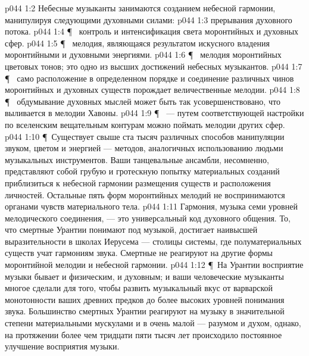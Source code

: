 \vs p044 1:2 Небесные музыканты занимаются созданием небесной гармонии, манипулируя следующими духовными силами:
\vs p044 1:3 \bibnobreakspace {} прерывания духовного потока.
\vs p044 1:4 \P\ \bibnobreakspace {} контроль и интенсификация света моронтийных и духовных сфер.
\vs p044 1:5 \P\ \bibnobreakspace {} мелодия, являющаяся результатом искусного владения моронтийными и духовными энергиями.
\vs p044 1:6 \P\ \bibnobreakspace {} мелодия моронтийных цветовых тонов; это одно из высших достижений небесных музыкантов.
\vs p044 1:7 \P\ \bibnobreakspace {} само расположение в определенном порядке и соединение различных чинов моронтийных и духовных существ порождает величественные мелодии.
\vs p044 1:8 \P\ \bibnobreakspace {} обдумывание духовных мыслей может быть так усовершенствовано, что выливается в мелодии Хавоны.
\vs p044 1:9 \P\ \bibnobreakspace {} --- путем соответствующей настройки по вселенским вещательным контурам можно поймать мелодии других сфер.
\vs p044 1:10 \P\ Существует свыше ста тысяч различных способов манипуляции звуком, цветом и энергией --- методов, аналогичных использованию людьми музыкальных инструментов. Ваши танцевальные ансамбли, несомненно, представляют собой грубую и гротескную попытку материальных созданий приблизиться к небесной гармонии размещения существ и расположения личностей. Остальные пять форм моронтийных мелодий не воспринимаются органами чувств материального тела.
\vs p044 1:11 Гармония, музыка семи уровней мелодического соединения, --- это универсальный код духовного общения. То, что смертные Урантии понимают под музыкой, достигает наивысшей выразительности в школах Иерусема --- столицы системы, где полуматериальных существ учат гармониям звука. Смертные не реагируют на другие формы моронтийной мелодии и небесной гармонии.
\vs p044 1:12 \P\ На Урантии восприятие музыки бывает и физическим, и духовным; и ваши человеческие музыканты многое сделали для того, чтобы развить музыкальный вкус от варварской монотонности ваших древних предков до более высоких уровней понимания звука. Большинство смертных Урантии реагируют на музыку в значительной степени материальными мускулами и в очень малой --- разумом и духом, однако, на протяжении более чем тридцати пяти тысяч лет происходило постоянное улучшение восприятия музыки.
